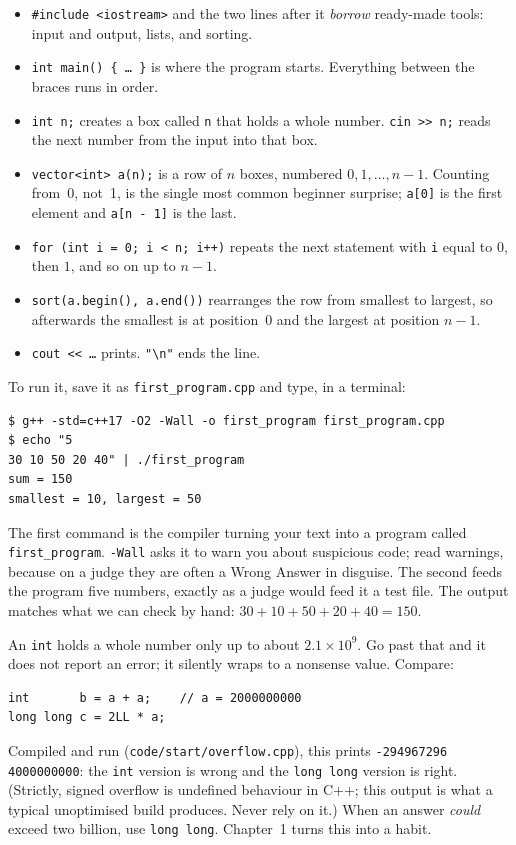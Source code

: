 \begin{itemize}
\item \texttt{\#include <iostream>} and the two lines after it \emph{borrow}
      ready-made tools: input and output, lists, and sorting.
\item \texttt{int main() \{ \dots\ \}} is where the program starts. Everything
      between the braces runs in order.
\item \texttt{int n;} creates a box called \texttt{n} that holds a whole number.
      \texttt{cin >> n;} reads the next number from the input into that box.
\item \texttt{vector<int> a(n);} is a row of $n$ boxes, numbered $0,1,\dots,n-1$.
      Counting from~0, not~1, is the single most common beginner surprise;
      \texttt{a[0]} is the first element and \texttt{a[n - 1]} is the last.
\item \texttt{for (int i = 0; i < n; i++)} repeats the next statement with
      \texttt{i} equal to $0$, then $1$, and so on up to $n-1$.
\item \texttt{sort(a.begin(), a.end())} rearranges the row from smallest to
      largest, so afterwards the smallest is at position~0 and the largest at
      position $n-1$.
\item \texttt{cout << \dots} prints. \texttt{"\textbackslash n"} ends the line.
\end{itemize}

To run it, save it as \texttt{first\_program.cpp} and type, in a terminal:

\begin{lstlisting}[numbers=none]
$ g++ -std=c++17 -O2 -Wall -o first_program first_program.cpp
$ echo "5
30 10 50 20 40" | ./first_program
sum = 150
smallest = 10, largest = 50
\end{lstlisting}

The first command is the compiler turning your text into a program called
\texttt{first\_program}. \texttt{-Wall} asks it to warn you about suspicious code;
read warnings, because on a judge they are often a Wrong Answer in disguise. The
second feeds the program five numbers, exactly as a judge would feed it a test
file. The output matches what we can check by hand: $30+10+50+20+40=150$.

\begin{tripwire}
An \texttt{int} holds a whole number only up to about $2.1\times10^{9}$. Go past that and it
does not report an error; it silently wraps to a nonsense value. Compare:
\begin{lstlisting}[numbers=none]
int       b = a + a;    // a = 2000000000
long long c = 2LL * a;
\end{lstlisting}
Compiled and run (\texttt{code/start/overflow.cpp}), this prints
\texttt{-294967296 4000000000}: the \texttt{int} version is wrong and the
\texttt{long long} version is right. (Strictly, signed overflow is undefined
behaviour in C++; this output is what a typical unoptimised build produces. Never rely on it.)
When an answer \emph{could} exceed two billion, use \texttt{long long}. Chapter~1
turns this into a habit.
\end{tripwire}

